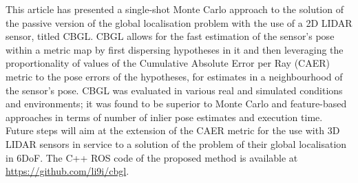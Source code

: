 This article has presented a single-shot Monte Carlo approach to the solution
of the passive version of the global localisation problem with the use of a 2D
LIDAR sensor, titled CBGL. CBGL allows for the fast estimation of the sensor's
pose within a metric map by first dispersing hypotheses in it and then
leveraging the proportionality of values of the Cumulative Absolute Error per
Ray (CAER) metric to the pose errors of the hypotheses, for estimates in a
neighbourhood of the sensor's pose. CBGL was evaluated in various real and
simulated conditions and environments; it was found to be superior to Monte
Carlo and feature-based approaches in terms of number of inlier pose estimates
and execution time. Future steps will aim at the extension of the CAER metric
for the use with 3D LIDAR sensors in service to a solution of the problem of
their global localisation in 6DoF.
The C++ ROS code of the proposed method is available at
\url{https://github.com/li9i/cbgl}.
